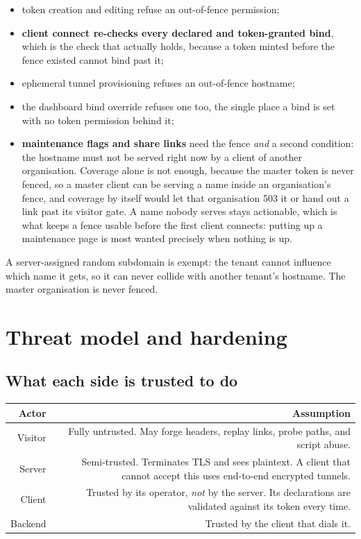 \documentclass[11pt,a4paper,oneside]{book}
\begin{document}
\begin{itemize}[leftmargin=1.3em]
  \item token creation and editing refuse an out-of-fence permission;
  \item \textbf{client connect re-checks every declared and token-granted
        bind}, which is the check that actually holds, because a token
        minted before the fence existed cannot bind past it;
  \item ephemeral tunnel provisioning refuses an out-of-fence hostname;
  \item the dashboard bind override refuses one too, the single place a
        bind is set with no token permission behind it;
  \item \textbf{maintenance flags and share links} need the fence
        \emph{and} a second condition: the hostname must not be served
        right now by a client of another organisation. Coverage alone is
        not enough, because the master token is never fenced, so a master
        client can be serving a name inside an organisation's fence, and
        coverage by itself would let that organisation 503 it or hand out
        a link past its visitor gate. A name nobody serves stays
        actionable, which is what keeps a fence usable before the first
        client connects: putting up a maintenance page is most wanted
        precisely when nothing is up.
\end{itemize}

A server-assigned random subdomain is exempt: the tenant cannot influence
which name it gets, so it can never collide with another tenant's
hostname. The master organisation is never fenced.

\chapter{Threat model and hardening}
\label{ch:threat}

\section{What each side is trusted to do}

\begin{longtable}{@{}R{0.18}R{0.76}@{}}
\toprule
\textbf{Actor} & \textbf{Assumption} \\
\midrule
\endhead
Visitor & Fully untrusted. May forge headers, replay links, probe paths,
and script abuse. \\
Server & Semi-trusted. Terminates TLS and sees plaintext. A client that
cannot accept this uses end-to-end encrypted tunnels. \\
Client & Trusted by its operator, \emph{not} by the server. Its
declarations are validated against its token every time. \\
Backend & Trusted by the client that dials it. \\
\bottomrule
\end{longtable}
\end{document}
